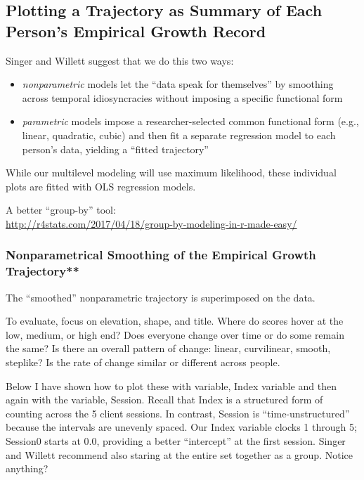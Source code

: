 \documentclass[
  english,
]{book}
\providecommand{\tightlist}{%
  \setlength{\itemsep}{0pt}\setlength{\parskip}{0pt}}
\begin{document}
\hypertarget{plotting-a-trajectory-as-summary-of-each-persons-empirical-growth-record}{%
\subsection{Plotting a Trajectory as Summary of Each Person's Empirical Growth Record}\label{plotting-a-trajectory-as-summary-of-each-persons-empirical-growth-record}}

Singer and Willett \citeyearpar{singer_applied_2003} suggest that we do this two ways:

\begin{itemize}
\tightlist
\item
  \emph{nonparametric} models let the ``data speak for themselves'' by smoothing across temporal idiosyncracies without imposing a specific functional form
\item
  \emph{parametric} models impose a researcher-selected common functional form (e.g., linear, quadratic, cubic) and then fit a separate regression model to each person's data, yielding a ``fitted trajectory''
\end{itemize}

While our multilevel modeling will use maximum likelihood, these individual plots are fitted with OLS regression models.

A better ``group-by'' tool:\\
\url{http://r4stats.com/2017/04/18/group-by-modeling-in-r-made-easy/}

\hypertarget{nonparametrical-smoothing-of-the-empirical-growth-trajectory}{%
\subsubsection{Nonparametrical Smoothing of the Empirical Growth Trajectory**}\label{nonparametrical-smoothing-of-the-empirical-growth-trajectory}}

The ``smoothed'' nonparametric trajectory is superimposed on the data.

To evaluate, focus on elevation, shape, and title. Where do scores hover at the low, medium, or high end? Does everyone change over time or do some remain the same? Is there an overall pattern of change: linear, curvilinear, smooth, steplike? Is the rate of change similar or different across people.

Below I have shown how to plot these with variable, Index variable and then again with the variable, Session. Recall that Index is a structured form of counting across the 5 client sessions. In contrast, Session is ``time-unstructured'' because the intervals are unevenly spaced. Our Index variable clocks 1 through 5; Session0 starts at 0.0, providing a better ``intercept'' at the first session. Singer and Willett \citeyearpar{singer_applied_2003} recommend also staring at the entire set together as a group. Notice anything?
\end{document}

